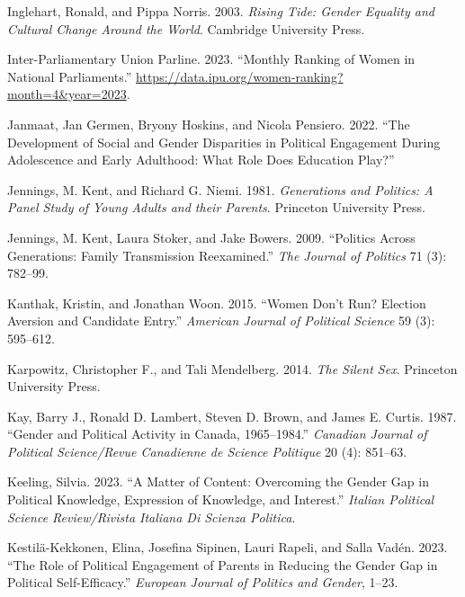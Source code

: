 \documentclass[
  letterpaper,
  DIV=11,
  numbers=noendperiod]{scrreprt}
\newlength{\cslhangindent}
\newlength{\cslentryspacingunit} %
\newenvironment{CSLReferences}[2] %
 {%
  \setlength{\parindent}{0pt}
  \ifodd #1
  \let\oldpar\par
  \def\par{\hangindent=\cslhangindent\oldpar}
  \fi
  \setlength{\parskip}{#2\cslentryspacingunit}
 }%
 {}
\begin{document}
\begin{CSLReferences}{1}{0}
\leavevmode{}%
Inglehart, Ronald, and Pippa Norris. 2003. \emph{{Rising Tide: Gender
Equality and Cultural Change Around the World}}. Cambridge University
Press.

\leavevmode{}%
Inter-Parliamentary Union Parline. 2023. {``{Monthly Ranking of Women in
National Parliaments}.''}
\url{https://data.ipu.org/women-ranking?month=4\&year=2023}.

\leavevmode{}%
Janmaat, Jan Germen, Bryony Hoskins, and Nicola Pensiero. 2022. {``{The
Development of Social and Gender Disparities in Political Engagement
During Adolescence and Early Adulthood: What Role Does Education
Play?}''}

\leavevmode{}%
Jennings, M. Kent, and Richard G. Niemi. 1981. \emph{{Generations and
Politics: A Panel Study of Young Adults and their Parents}}. Princeton
University Press.

\leavevmode{}%
Jennings, M. Kent, Laura Stoker, and Jake Bowers. 2009. {``{Politics
Across Generations: Family Transmission Reexamined}.''} \emph{The
Journal of Politics} 71 (3): 782--99.

\leavevmode{}%
Kanthak, Kristin, and Jonathan Woon. 2015. {``{Women Don't Run? Election
Aversion and Candidate Entry}.''} \emph{American Journal of Political
Science} 59 (3): 595--612.

\leavevmode{}%
Karpowitz, Christopher F., and Tali Mendelberg. 2014. \emph{{The Silent
Sex}}. Princeton University Press.

\leavevmode{}%
Kay, Barry J., Ronald D. Lambert, Steven D. Brown, and James E. Curtis.
1987. {``{Gender and Political Activity in Canada, 1965--1984}.''}
\emph{Canadian Journal of Political Science/Revue Canadienne de Science
Politique} 20 (4): 851--63.

\leavevmode{}%
Keeling, Silvia. 2023. {``{A Matter of Content: Overcoming the Gender
Gap in Political Knowledge, Expression of Knowledge, and Interest}.''}
\emph{Italian Political Science Review/Rivista Italiana Di Scienza
Politica}.

\leavevmode{}%
Kestilä-Kekkonen, Elina, Josefina Sipinen, Lauri Rapeli, and Salla
Vadén. 2023. {``{The Role of Political Engagement of Parents in Reducing
the Gender Gap in Political Self-Efficacy}.''} \emph{European Journal of
Politics and Gender}, 1--23.


\end{CSLReferences}
\end{document}
